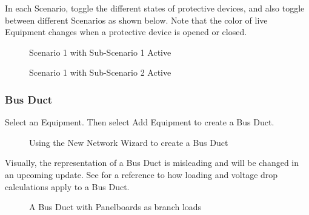 \documentclass[letterpaper,10pt,english]{sphinxmanual}
\begin{document}
In each Scenario, toggle the different states of protective devices, and also toggle between different Scenarios as shown below.  Note that the color of live Equipment changes when a protective device is opened or closed.

\begin{figure}[H]
\centering
\capstart

\noindent{}
\caption{Scenario 1 with Sub-Scenario 1 Active}\label{\detokenize{docs/userguide/buildingelectricalmodel/one-line/index-one-line:id34}}\end{figure}

\begin{figure}[H]
\centering
\capstart

\noindent{}
\caption{Scenario 1 with Sub-Scenario 2 Active}\label{\detokenize{docs/userguide/buildingelectricalmodel/one-line/index-one-line:id35}}\end{figure}


\subsubsection{Bus Duct}
\label{\detokenize{docs/userguide/buildingelectricalmodel/one-line/index-one-line:bus-duct}}\label{\detokenize{docs/userguide/buildingelectricalmodel/one-line/index-one-line:one-line-bus-duct}}
Select an Equipment.  Then select Add Equipment to create a Bus Duct.

\begin{figure}[H]
\centering
\capstart

\noindent{}
\caption{Using the New Network Wizard to create a Bus Duct}\label{\detokenize{docs/userguide/buildingelectricalmodel/one-line/index-one-line:id36}}\end{figure}

Visually, the representation of a Bus Duct is misleading and will be changed in an upcoming update.  See {\hyperref[\detokenize{docs/faq:bus-duct-calculations}]{}} for a reference to how loading and voltage drop calculations apply to a Bus Duct.

\begin{figure}[H]
\centering
\capstart

\noindent{}
\caption{A Bus Duct with Panelboards as branch loads}\label{\detokenize{docs/userguide/buildingelectricalmodel/one-line/index-one-line:id37}}\end{figure}
\end{document}
